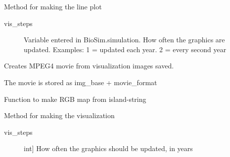 \documentclass[a4paper,10pt,english]{sphinxmanual}
\begin{document}
\begin{fulllineitems}
\begin{fulllineitems}
\end{fulllineitems}


\begin{fulllineitems}
\label{\detokenize{simulation:biosim.simulation.BioSim.make_line_plot}}
Method for making the line plot
\begin{description}
\item[{vis\_steps}] \leavevmode
Variable entered in BioSim.simulation.
How often the graphics are updated.
Examples: 1 = updated each year. 2 = every second year

\end{description}

\end{fulllineitems}


\begin{fulllineitems}
\label{\detokenize{simulation:biosim.simulation.BioSim.make_movie}}
Creates MPEG4 movie from visualization images saved.

The movie is stored as img\_base + movie\_format

\end{fulllineitems}


\begin{fulllineitems}
\label{\detokenize{simulation:biosim.simulation.BioSim.make_rgb_map}}
Function to make RGB map from island-string

\end{fulllineitems}


\begin{fulllineitems}
\label{\detokenize{simulation:biosim.simulation.BioSim.make_visualization}}
Method for making the visualization
\begin{description}
\item[{vis\_steps}] \leavevmode{[}int{]}
How often the graphics should be updated, in years


\end{description}
\end{fulllineitems}
\end{fulllineitems}
\end{document}
